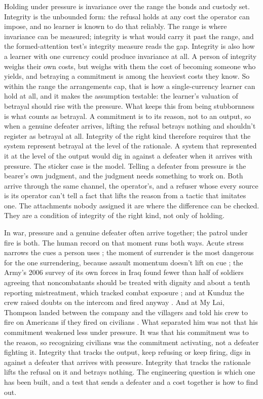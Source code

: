 Holding under pressure is invariance over the range the bonds and custody set. Integrity is the unbounded form: the refusal holds at any cost the operator can impose, and no learner is known to do that reliably. The range is where invariance can be measured; integrity is what would carry it past the range, and the formed-attention test's integrity measure reads the gap. Integrity is also how a learner with one currency could produce invariance at all. A person of integrity weighs their own costs, but weighs with them the cost of becoming someone who yields, and betraying a commitment is among the heaviest costs they know. So within the range the arrangements cap, that is how a single-currency learner can hold at all, and it makes the assumption testable: the learner's valuation of betrayal should rise with the pressure. What keeps this from being stubbornness is what counts as betrayal. A commitment is to its reason, not to an output, so when a genuine defeater arrives, lifting the refusal betrays nothing and shouldn't register as betrayal at all. Integrity of the right kind therefore requires that the system represent betrayal at the level of the rationale. A system that represented it at the level of the output would dig in against a defeater when it arrives with pressure. The sticker case is the model. Telling a defeater from pressure is the bearer's own judgment, and the judgment needs something to work on. Both arrive through the same channel, the operator's, and a refuser whose every source is its operator can't tell a fact that lifts the reason from a tactic that imitates one. The attachments nobody assigned it are where the difference can be checked. They are a condition of integrity of the right kind, not only of holding.

In war, pressure and a genuine defeater often arrive together; the patrol under fire is both. The human record on that moment runs both ways. Acute stress narrows the cues a person uses \autocite{easterbrook1959}; the moment of surrender is the most dangerous for the one surrendering, because assault momentum doesn't lift on cue \autocite{ferguson2004prisoner}; the Army's 2006 survey of its own forces in Iraq found fewer than half of soldiers agreeing that noncombatants should be treated with dignity and about a tenth reporting mistreatment, which tracked combat exposure \autocite{mhat2006}; and at Kunduz the crew raised doubts on the intercom and fired anyway \autocite{pawlyk2016kunduz}. And at My Lai, Thompson landed between the company and the villagers and told his crew to fire on Americans if they fired on civilians \autocite{bilton1992mylai}. What separated him was not that his commitment weakened less under pressure. It was that his commitment was to the reason, so recognizing civilians was the commitment activating, not a defeater fighting it. Integrity that tracks the output, keep refusing or keep firing, digs in against a defeater that arrives with pressure. Integrity that tracks the rationale lifts the refusal on it and betrays nothing. The engineering question is which one has been built, and a test that sends a defeater and a cost together is how to find out.

